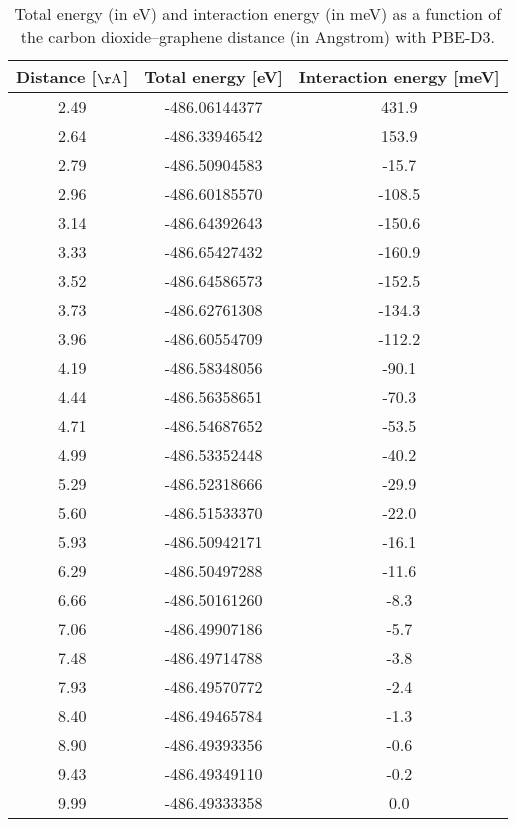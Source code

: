\begin{table}[h]
\centering
\begin{tabular}{ccc}
\hline
Distance [$\mathrm{\AA}$] & Total energy [eV] & Interaction energy [meV] \\
\hline
2.49 & -486.06144377 & 431.9 \\
2.64 & -486.33946542 & 153.9 \\
2.79 & -486.50904583 & -15.7 \\
2.96 & -486.60185570 & -108.5 \\
3.14 & -486.64392643 & -150.6 \\
3.33 & -486.65427432 & -160.9 \\
3.52 & -486.64586573 & -152.5 \\
3.73 & -486.62761308 & -134.3 \\
3.96 & -486.60554709 & -112.2 \\
4.19 & -486.58348056 & -90.1 \\
4.44 & -486.56358651 & -70.3 \\
4.71 & -486.54687652 & -53.5 \\
4.99 & -486.53352448 & -40.2 \\
5.29 & -486.52318666 & -29.9 \\
5.60 & -486.51533370 & -22.0 \\
5.93 & -486.50942171 & -16.1 \\
6.29 & -486.50497288 & -11.6 \\
6.66 & -486.50161260 & -8.3 \\
7.06 & -486.49907186 & -5.7 \\
7.48 & -486.49714788 & -3.8 \\
7.93 & -486.49570772 & -2.4 \\
8.40 & -486.49465784 & -1.3 \\
8.90 & -486.49393356 & -0.6 \\
9.43 & -486.49349110 & -0.2 \\
9.99 & -486.49333358 & 0.0 \\
\hline
\end{tabular}
\caption{Total energy (in eV) and interaction energy (in meV) as a function of the carbon dioxide--graphene distance (in Angstrom) with PBE-D3.}
\label{SI_dft_table_PBE-D3}
\end{table}